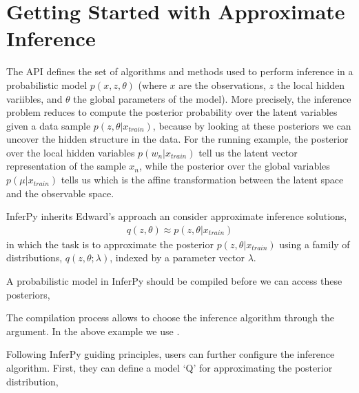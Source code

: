 \documentclass[letterpaper,10pt,english]{sphinxmanual}
\begin{document}
\section{Getting Started with Approximate Inference}
\label{\detokenize{notes/guideinference:getting-started-with-approximate-inference}}
The API defines the set of algorithms and methods used to perform
inference in a probabilistic model \(p(x,z,\theta)\) (where
\(x\) are the observations, \(z\) the local hidden variibles,
and \(\theta\) the global parameters of the model). More precisely,
the inference problem reduces to compute the posterior probability over
the latent variables given a data sample
\(p(z,\theta | x_{train})\), because by looking at these
posteriors we can uncover the hidden structure in the data. For the
running example, the posterior over the local hidden variables \(p(w_n|x_{train})\)
tell us the latent vector representation of the sample \(x_n\), while the posterior
over the global variables \(p(\mu|x_{train})\) tells us which is the affine transformation
between the latent space and the observable space.

InferPy inherits Edward’s approach an consider approximate inference
solutions,
\begin{equation*}
\begin{split}q(z,\theta) \approx p(z,\theta | x_{train})\end{split}
\end{equation*}
in which the task is to approximate the posterior
\(p(z,\theta | x_{train})\) using a family of distributions,
\(q(z,\theta; \lambda)\), indexed by a parameter vector
\(\lambda\).

A probabilistic model in InferPy should be compiled before we can access
these posteriors,

\begin{sphinxVerbatim}[commandchars=\\\{\}]
\end{sphinxVerbatim}

The compilation process allows to choose the inference algorithm through
the  argument. In the above example we use .

Following InferPy guiding principles, users can further configure the
inference algorithm. First, they can define a model ‘Q’ for approximating the
posterior distribution,
\end{document}
